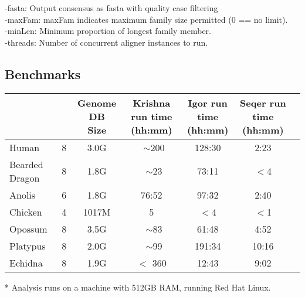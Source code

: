 \documentclass[12pt]{article}
\begin{document}
\noindent -fasta: Output consensus as fasta with quality case filtering\\
-maxFam: maxFam indicates maximum family size permitted (0 == no limit).\\
-minLen: Minimum proportion of longest family member.\\
-threads: Number of concurrent aligner instances to run.


\subsection{Benchmarks}

\footnotesize  %
\setlength\tabcolsep{1.5pt}
\begin{center}
	\begin{tabular}{|l|c|c|c|c|c|c|}
		\hline
		\thead{Genome}	&	\thead{ Krishna Threads }	&	\thead{Genome DB \\ Size}	& \thead{Krishna run time \\ (hh:mm)}	&	\thead{Igor run time \\ (hh:mm)}	&	\thead{Seqer run time \\ (hh:mm)}  \\
		\hline
		Human	&	8	&	3.0G	&	~$\sim$200	&	128:30	&	2:23 \\
		\hline 
		Bearded Dragon	&	8	&	1.8G	&	~$\sim$23	&	73:11	&	$<$4 \\
		\hline
		Anolis	& 6	& 1.8G	& 76:52	&	97:32	& 2:40	\\
		\hline
		Chicken	&	4	&	1017M	&	5	&	$<$4 & $<$1 \\
		\hline
		Opossum	&	8	&	3.5G	&	~$\sim$83	&	61:48	&	4:52 \\
		\hline
		Platypus	&	8	&	2.0G	&	~$\sim$99	&	191:34	&	10:16 \\
		\hline
		Echidna	&	8	&	1.9G	&	$<$ 360	&	12:43	&	9:02 \\
		\hline
	\end{tabular}
\end{center}

* Analysis runs on a machine with 512GB RAM, running Red Hat Linux.

\end{document}
